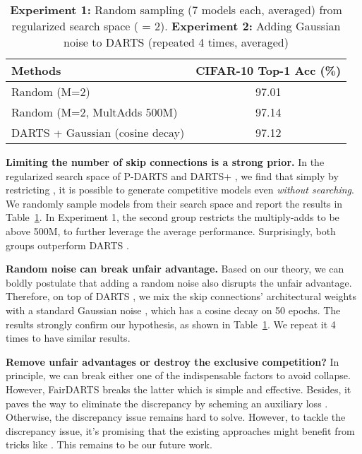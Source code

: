 \documentclass[runningheads]{llncs}
\begin{document}
\setlength{\tabcolsep}{4pt}
\begin{table}
	\begin{center}
	\caption{\textbf{Experiment 1:} Random sampling (7 models each, averaged) from regularized search space ( = 2). \textbf{Experiment 2:} Adding Gaussian noise to DARTS (repeated 4 times, averaged)}
	\label{tab:noisy-darts}	
		\begin{footnotesize}
		\begin{tabular}{lc}
				\hline\noalign{\smallskip}
				Methods  & CIFAR-10 Top-1 Acc (\%) \\
				\hline\noalign{\smallskip} Random (M=2)  & 97.01   \\
				Random (M=2, MultAdds  500M)   & 97.14   \\
				\hline\noalign{\smallskip}
				DARTS + Gaussian (cosine decay)  & 97.12   \\


				\hline
\end{tabular}
		\end{footnotesize}
	\end{center}
\end{table}




\textbf{Limiting the number of skip connections is a strong prior.}  In the regularized search space of P-DARTS \cite{chen2019progressive}  and DARTS+ \cite{liang2019darts}, we find that simply by restricting , it is possible to generate competitive models even \emph{without searching}. We randomly sample models from their search space and report the results in Table~\ref{tab:noisy-darts}. In Experiment 1, the second group restricts the multiply-adds to be above 500M, to further leverage the average performance.  Surprisingly, both groups outperform DARTS \cite{liu2018darts}.  




\textbf{Random noise can break unfair advantage.} Based on our theory, we can boldly postulate that adding a random noise also disrupts the unfair advantage. Therefore, on top of DARTS \cite{liu2018darts}, we mix the skip connections' architectural weights with a standard Gaussian noise , which has a cosine decay on 50 epochs. The results strongly confirm our hypothesis, as shown in Table~\ref{tab:noisy-darts}. We repeat it 4 times to have similar results. 

\textbf{Remove unfair advantages or destroy the exclusive competition?} In principle, we can break either one of the indispensable factors to avoid collapse. However,  FairDARTS breaks the latter which is simple and effective. Besides, it paves the way to eliminate the discrepancy by scheming an auxiliary loss . Otherwise, the discrepancy issue remains hard to solve. However, to tackle the discrepancy issue, it's promising that the existing approaches might benefit from tricks like . This remains to be our future work.  
\end{document}
